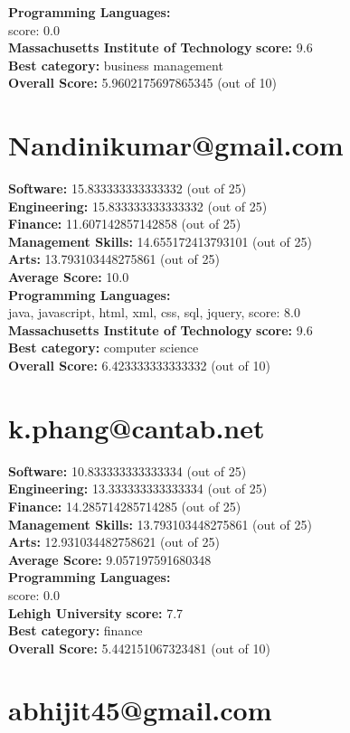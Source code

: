 \documentclass{article}
\begin{document}
\textbf{Programming Languages:} \\
score: 0.0\\
\textbf{Massachusetts Institute of Technology} \textbf{score:} 9.6\\
\textbf{Best category: } business management\\
\textbf{Overall Score: }5.9602175697865345 (out of 10)\section{Nandinikumar@gmail.com}
\textbf{Software:} 15.833333333333332 (out of 25)\\
\textbf{Engineering: } 15.833333333333332 (out of 25)\\
\textbf{Finance:} 11.607142857142858 (out of 25)\\
\textbf{Management Skills:} 14.655172413793101 (out of 25)\\
\textbf{Arts:} 13.793103448275861 (out of 25)\\
\textbf{Average Score: } 10.0\\
\textbf{Programming Languages:} \\
java, javascript, html, xml, css, sql, jquery, score: 8.0\\
\textbf{Massachusetts Institute of Technology} \textbf{score:} 9.6\\
\textbf{Best category: } computer science\\
\textbf{Overall Score: }6.423333333333332 (out of 10)\section{k.phang@cantab.net}
\textbf{Software:} 10.833333333333334 (out of 25)\\
\textbf{Engineering: } 13.333333333333334 (out of 25)\\
\textbf{Finance:} 14.285714285714285 (out of 25)\\
\textbf{Management Skills:} 13.793103448275861 (out of 25)\\
\textbf{Arts:} 12.931034482758621 (out of 25)\\
\textbf{Average Score: } 9.057197591680348\\
\textbf{Programming Languages:} \\
score: 0.0\\
\textbf{Lehigh University} \textbf{score:} 7.7\\
\textbf{Best category: } finance\\
\textbf{Overall Score: }5.442151067323481 (out of 10)\section{abhijit45@gmail.com}
\end{document}
